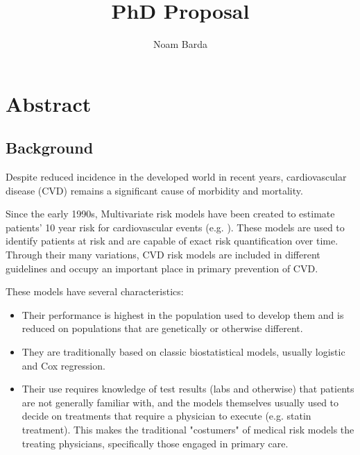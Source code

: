 \documentclass[a4paper,12pt]{article}
\begin{document}
	
	\title{PhD Proposal}
	\author{Noam Barda}
	\maketitle
	
	\tableofcontents
	\newpage
	
	\section{Abstract}
	
		\subsection{Background}
		Despite reduced incidence in the developed world in recent years\cite{Koton2014,Vangen-Loenne2017}, cardiovascular disease (CVD) remains a significant cause of morbidity and mortality\cite{ODonnell2016}.
	
		Since the early 1990s, Multivariate risk models have been created to estimate patients' 10 year risk for cardiovascular events (e.g. \cite{Wilson1998,Conroy2003,DAgostino2008}). These models are used to identify patients at risk and are capable of exact risk quantification over time\cite{Goff2014}. Through their many variations, CVD risk models are included in different guidelines and occupy an important place in primary prevention of CVD\cite{Graham2007,Goff2014}.
	
		These models have several characteristics:
		\begin{itemize}
			\item Their performance is highest in the population used to develop them and is reduced on populations that are genetically or otherwise different\cite{DAgostino2001,Bastuji-Garin2002,DeFilippis2015}.
			\item They are traditionally based on classic biostatistical models, usually logistic and Cox regression.
			\item Their use requires knowledge of test results (labs and otherwise) that patients are not generally familiar with, and the models themselves usually used to decide on treatments that require a physician to execute (e.g. statin treatment). This makes the traditional "costumers" of medical risk models the treating physicians, specifically those engaged in primary care.
		\end{itemize}
	
\end{document}
